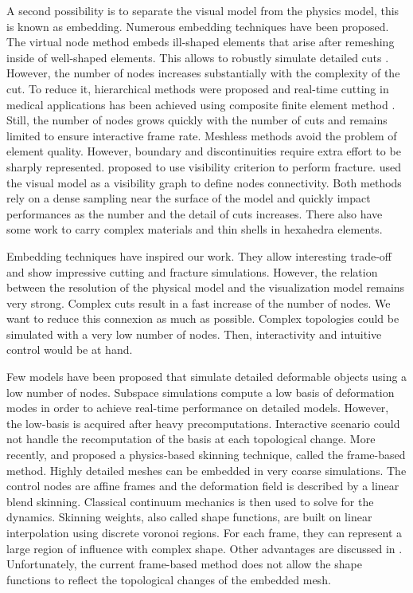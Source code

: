 \documentclass[11pt, oneside, a4paper]{memoir}
\begin{document}
A second possibility is to separate the visual model from the physics model, this is known as embedding. Numerous embedding techniques have been proposed. The virtual node method \cite{Molino2004} embeds ill-shaped elements that arise after remeshing inside of well-shaped elements. This allows to robustly simulate detailed cuts \cite{Wang2014}. However, the number of nodes increases substantially with the complexity of the cut. To reduce it, hierarchical methods were proposed and real-time cutting in medical applications has been achieved using composite finite element method \cite{Wu2011}. Still, the number of nodes grows quickly with the number of cuts and remains limited to ensure interactive frame rate. Meshless methods avoid the problem of element quality. However, boundary and discontinuities require extra effort to be sharply represented. \cite{Pauly2005} proposed to use visibility criterion to perform fracture. \cite{Steinemann2009} used the visual model as a visibility graph to define nodes connectivity. Both methods rely on a dense sampling near the surface of the model and quickly impact performances as the number  and the detail of cuts increases. There also have some work to carry complex materials \cite{Nesme2009} and thin shells \cite{Remillard2013} in hexahedra elements.

Embedding techniques have inspired our work. They allow interesting trade-off and show impressive cutting and fracture simulations. However, the relation between the resolution of the physical model and the visualization model remains very strong. Complex cuts result in a fast increase of the number of nodes. We want to reduce this connexion as much as possible. Complex topologies could be simulated with a very low number of nodes. Then, interactivity and intuitive control would be at hand.

Few models have been proposed that simulate detailed deformable objects using a low number of nodes. Subspace simulations \cite{Barbic2005} compute a low basis of deformation modes in order to achieve real-time performance on detailed models. However, the low-basis is acquired after heavy precomputations. Interactive scenario could not handle the recomputation of the basis at each topological change. More recently, \cite{Gilles2011} and \cite{Faure2011} proposed a physics-based skinning technique, called the frame-based method. Highly detailed meshes can be embedded in very coarse simulations. The control nodes are affine frames and the deformation field is described by a linear blend skinning. Classical continuum mechanics is then used to solve for the dynamics. Skinning weights, also called shape functions, are built on linear interpolation using discrete voronoi regions. For each frame, they can represent a large region of influence with complex shape. Other advantages are discussed in \cite{Faure2011}. Unfortunately, the current frame-based method does not allow the shape functions to reflect the topological changes of the embedded mesh.
\end{document}
